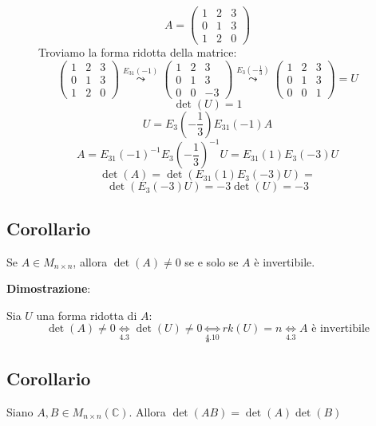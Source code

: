 \documentclass[a4paper]{article}
\theoremstyle{break}
\theoremstyle{break}
\theoremstyle{break}
\theoremstyle{break}
\begin{document}
\begin{figure}[H]
  \begin{example}
    \[
    A = \begin{pmatrix}
      1 & 2 & 3\\
      0 & 1 & 3\\
      1 & 2 & 0
    \end{pmatrix} 
    \] 
    Troviamo la forma ridotta della matrice:
    \[
    \begin{pmatrix} 
      1 & 2 & 3\\
      0 & 1 & 3\\
      1 & 2 & 0
    \end{pmatrix} 
    \stackrel{E_{31}(-1)}{\leadsto}
    \begin{pmatrix} 
      1 & 2 & 3\\
      0 & 1 & 3\\
      0 & 0 & -3
    \end{pmatrix}
    \stackrel{E_3(-\frac{1}{3})}{\leadsto}
    \begin{pmatrix} 
      1 & 2 & 3\\
      0 & 1 & 3\\
      0 & 0 & 1
    \end{pmatrix} = U
    \] 
    \[
    \det(U) = 1
    \] 
    \[
      U = E_3(-\frac{1}{3})E_{31}(-1)A
    \] 
    \[
      A = E_{31}(-1)^{-1}E_3(-\frac{1}{3})^{-1}U = E_{31}(1)E_3(-3)U
    \] 
    \[
    \det(A) = \det(E_{31}(1)E_3(-3)U) = 
    \] 
    \[
    \det(E_3(-3)U) = -3\det(U) = -3
    \] 
  \end{example}
\end{figure}

\subsection{Corollario}
Se \( A \in M_{n \times n} \), allora \( \det(A) \neq 0 \) se e solo se \( A \) è
invertibile.

\vspace{1em}
\noindent \textbf{Dimostrazione}:

Sia \( U \) una forma ridotta di \( A \):
\[
  \det(A) \neq 0 \underset{4.3}{\Leftrightarrow} \det(U) \neq 0 \underset{4.10}{\Leftrightarrow} rk(U) = n
  \underset{4.3}{\Leftrightarrow} A \text{ è invertibile}
\] 
\[
\square
\] 
\subsection{Corollario}
Siano \( A,B \in M_{n \times n}(\mathbb{C}) \). Allora \( \det(AB) = \det(A) \det(B) \) 
\end{document}
